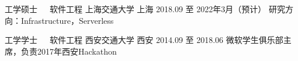 

\begin{cventries}

  \cventry
    {工学硕士~~~软件工程} %
    {上海交通大学} %
    {上海} %
    {2018.09 至 2022年3月（预计）} %
    {研究方向：Infrastructure，Serverless}

  \cventry
    {工学学士~~~软件工程} %
    {西安交通大学} %
    {西安} %
    {2014.09 至 2018.06} %
    {微软学生俱乐部主席，负责2017年西安Hackathon}

\end{cventries}
